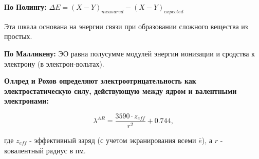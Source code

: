 \textbf{По Полингу:} $\Delta E = (X-Y)_{measured} -(X-Y)_{expected}$

\par\smallskip

Эта шкала основана на энергии связи при образовании сложного
вещества из простых.

\par\smallskip

\textbf{По Малликену:} ЭО равна полусумме модулей энергии ионизации и
сродства к электрону (в электрон-вольтах).

\par\smallskip

\textbf{Оллред и Рохов определяют электроотрицательность как
	электростатическую силу, действующую между ядром и
	валентными электронами:}

$$\lambda^{AR}= \frac{3590\cdot z_{eff}}{r^2} + 0.744,$$
	
где $z_{eff}$ - эффективный заряд (с учетом экранирования всеми $\bar{e}$), а  $r$ - ковалентный радиус в пм.

\par\bigskip
\par\bigskip
